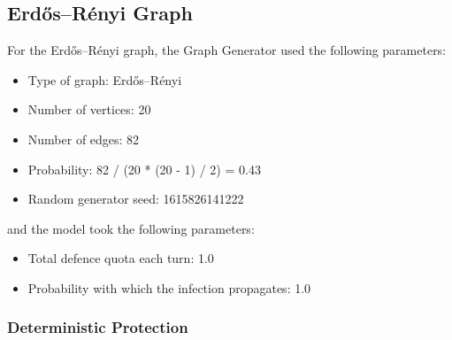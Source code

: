 \documentclass[results.tex]{subfiles}
\begin{document}
\newpage

\subsection{Erdős–Rényi Graph}

For the Erdős–Rényi graph, the Graph Generator used the following parameters:

\begin{itemize}
\item Type of graph: Erdős–Rényi
\item Number of vertices: 20
\item Number of edges: 82
\item Probability: 82 / (20 * (20 - 1) / 2) = 0.43
\item Random generator seed: 1615826141222
\end{itemize}
and the model took the following parameters:
\begin{itemize}
\item Total defence quota each turn: 1.0
\item Probability with which the infection propagates: 1.0
\end{itemize}

\subsubsection{Deterministic Protection}



\newpage
\end{document}
